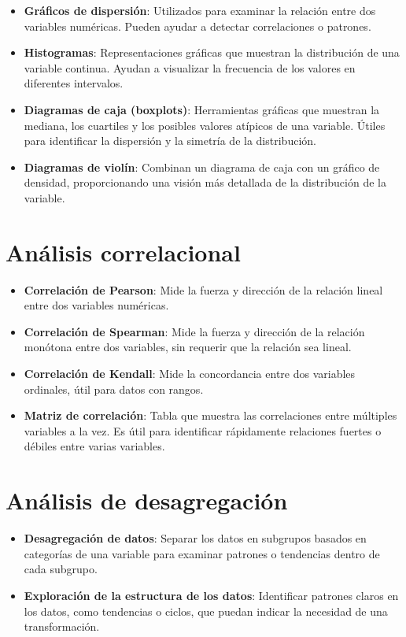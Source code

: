\documentclass[
  letterpaper,
  DIV=11,
  numbers=noendperiod]{scrreprt}
\providecommand{\tightlist}{%
  \setlength{\itemsep}{0pt}\setlength{\parskip}{0pt}}\usepackage{longtable,booktabs,array}
\begin{document}
\begin{itemize}
\tightlist
\item
  \textbf{Gráficos de dispersión}: Utilizados para examinar la relación
  entre dos variables numéricas. Pueden ayudar a detectar correlaciones
  o patrones.
\item
  \textbf{Histogramas}: Representaciones gráficas que muestran la
  distribución de una variable continua. Ayudan a visualizar la
  frecuencia de los valores en diferentes intervalos.
\item
  \textbf{Diagramas de caja (boxplots)}: Herramientas gráficas que
  muestran la mediana, los cuartiles y los posibles valores atípicos de
  una variable. Útiles para identificar la dispersión y la simetría de
  la distribución.
\item
  \textbf{Diagramas de violín}: Combinan un diagrama de caja con un
  gráfico de densidad, proporcionando una visión más detallada de la
  distribución de la variable.
\end{itemize}

\section{Análisis correlacional}\label{anuxe1lisis-correlacional}

\begin{itemize}
\tightlist
\item
  \textbf{Correlación de Pearson}: Mide la fuerza y dirección de la
  relación lineal entre dos variables numéricas.
\item
  \textbf{Correlación de Spearman}: Mide la fuerza y dirección de la
  relación monótona entre dos variables, sin requerir que la relación
  sea lineal.
\item
  \textbf{Correlación de Kendall}: Mide la concordancia entre dos
  variables ordinales, útil para datos con rangos.
\item
  \textbf{Matriz de correlación}: Tabla que muestra las correlaciones
  entre múltiples variables a la vez. Es útil para identificar
  rápidamente relaciones fuertes o débiles entre varias variables.
\end{itemize}

\section{Análisis de
desagregación}\label{anuxe1lisis-de-desagregaciuxf3n}

\begin{itemize}
\tightlist
\item
  \textbf{Desagregación de datos}: Separar los datos en subgrupos
  basados en categorías de una variable para examinar patrones o
  tendencias dentro de cada subgrupo.
\item
  \textbf{Exploración de la estructura de los datos}: Identificar
  patrones claros en los datos, como tendencias o ciclos, que puedan
  indicar la necesidad de una transformación.
\end{itemize}
\end{document}
